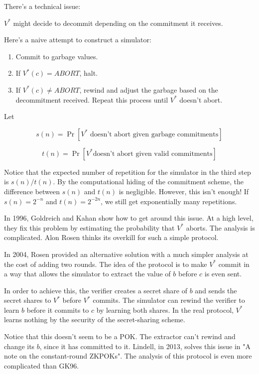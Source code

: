 \documentclass{article}
\theoremstyle{definition}
\begin{document}
There's a technical issue:

$V^{*}$ might decide to decommit depending on the commitment it receives.

Here's a naive attempt to construct a simulator:

\begin{enumerate}
    \item Commit to garbage values.
    \item If $V^{*}(c) = ABORT$, halt.
    \item If $V^{*}(c) \neq ABORT$, rewind and adjust the garbage based on the decommitment received. Repeat this process until $V^{*}$ doesn't abort.
\end{enumerate}

Let

\[ s(n) = \Pr[\text{$V^{*}$ doesn't abort given garbage commitments}]\]

\[ t(n) = \Pr[\text{$V^{*} $doesn't abort given valid commitments}]\]

Notice that the expected number of repetition for the simulator in the third step is $s(n)/t(n)$. By the computational hiding of the 
commitment scheme, the difference between $s(n)$ and $t(n)$ is negligible. However, this isn't enough! If $s(n) = 2^{-n}$ and 
$t(n) = 2^{-2n}$, we still get exponentially many repetitions. 

In 1996, Goldreich and Kahan show how to get around this issue. At a high level, they fix this problem by estimating the probability
that $V^{*}$ aborts. The analysis is complicated. Alon Rosen thinks its overkill for such a simple protocol.

In 2004, Rosen provided an alternative solution with a much simpler analysis at the cost of adding two rounds.
The idea of the protocol is to make $V^{*}$ commit in a way that allows the simulator to extract the value of
$b$ before $c$ is even sent.

In order to achieve this, the verifier creates a secret share of $b$ and sends the secret shares to $V^{*}$ before
$V^{*}$ commits. The simulator can rewind the verifier to learn $b$ before it commits to $c$ by learning both shares.
In the real protocol, $V^{*}$ learns nothing by the security of the secret-sharing scheme.

Notice that this doesn't seem to be a POK. The extractor can't rewind and change its $b$, since it has committed to it. Lindell,
in 2013, solves this issue in "A note on the constant-round ZKPOKs". The analysis of this protocol is even more complicated than
GK96.
\end{document}
